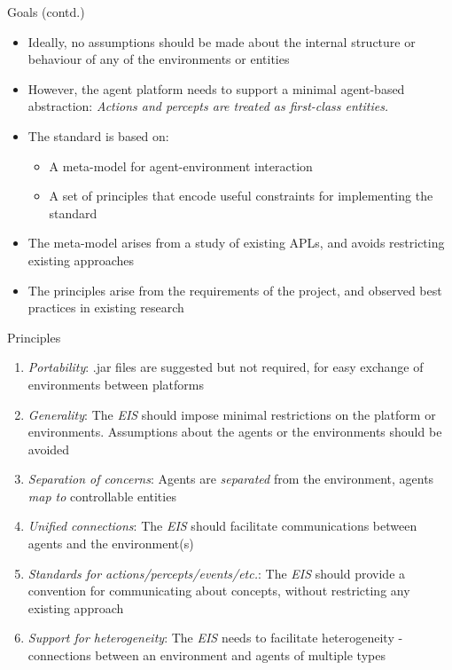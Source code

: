 \documentclass[t]{beamer}
\begin{document}
\begin{frame}{Goals (contd.)}
	\begin{itemize}[<+->]
		\item Ideally, no assumptions should be made about the internal structure or behaviour of any of the environments or entities
		\item However, the agent platform needs to support a minimal agent-based abstraction: \linebreak \textit{Actions and percepts are treated as first-class entities.}
		\item The standard is based on:
		\begin{itemize}
			\item A meta-model for agent-environment interaction
			\item A set of principles that encode useful constraints for implementing the standard
		\end{itemize}
		\item The meta-model arises from a study of existing APLs, and avoids restricting existing approaches
		\item The principles arise from the requirements of the project, and observed best practices in existing research
	\end{itemize}
\end{frame}
\begin{frame}{Principles}
	\begin{enumerate}[<+->]
		\item \textit{Portability}: .jar files are suggested but not required, for easy exchange of environments between platforms
		\item \textit{Generality}: The \emph{EIS} should impose minimal restrictions on the platform or environments. Assumptions about the agents or the environments should be avoided
		\item \textit{Separation of concerns}: Agents are \textit{separated} from the environment, agents \textit{map to} controllable entities
		\item \textit{Unified connections}: The \emph{EIS} should facilitate communications between agents and the environment(s)
		\item \textit{Standards for actions/percepts/events/etc.}: The \emph{EIS} should provide a convention for communicating about concepts, without restricting any existing approach
		\item \textit{Support for heterogeneity}: The \emph{EIS} needs to facilitate heterogeneity - connections between an environment and agents of multiple types
	\end{enumerate}
\end{frame}
\end{document}
